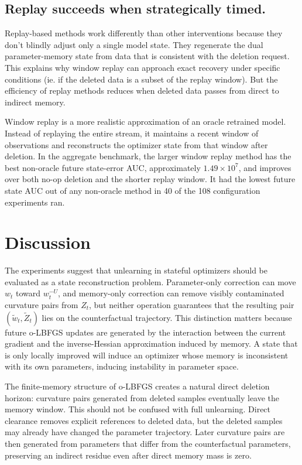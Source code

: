 \documentclass{ssl}
\begin{document}
\subsection{Replay succeeds when strategically timed.}
Replay-based methods work differently than other interventions because they don't blindly adjust only a single model state. They regenerate the dual parameter-memory state from data that is consistent with the deletion request. This explains why window replay can approach exact recovery under specific conditions (ie. if the deleted data is a subset of the replay window). But the efficiency of replay methods reduces when deleted data passes from direct to indirect memory.

Window replay is a more realistic approximation of an oracle retrained model. Instead of replaying the entire stream, it maintains a recent window of observations and reconstructs the optimizer state from that window after deletion. In the aggregate benchmark, the larger window replay method has the best non-oracle future state-error AUC, approximately $1.49 \times 10^7$, and improves over both no-op deletion and the shorter replay window. It had the lowest future state AUC out of any non-oracle method in 40 of the 108 configuration experiments ran. 

\section{Discussion}
The experiments suggest that unlearning in stateful optimizers should be evaluated as a state reconstruction problem. Parameter-only correction can move \(w_t\) toward \(w_t^{-U}\), and memory-only correction can remove visibly contaminated curvature pairs from \(Z_t\), but neither operation guarantees that the resulting pair \((\tilde w_t,\tilde Z_t)\) lies on the counterfactual trajectory. This distinction matters because future o-LBFGS updates are generated by the interaction between the current gradient and the inverse-Hessian approximation induced by memory. A state that is only locally improved will induce an optimizer whose memory is inconsistent with its own parameters, inducing instability in parameter space.

The finite-memory structure of o-LBFGS creates a natural direct deletion horizon: curvature pairs generated from deleted samples eventually leave the memory window. This should not be confused with full unlearning. Direct clearance removes explicit references to deleted data, but the deleted samples may already have changed the parameter trajectory. Later curvature pairs are then generated from parameters that differ from the counterfactual parameters, preserving an indirect residue even after direct memory mass is zero.
\end{document}
